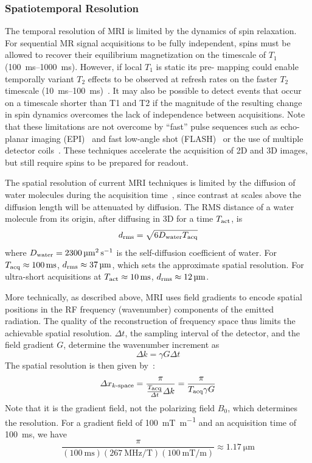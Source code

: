 \subsubsection{Spatiotemporal Resolution}

The temporal resolution of MRI is limited by the dynamics of spin relaxation. For sequential MR signal acquisitions to be fully independent, spins must be allowed to recover their equilibrium magnetization on the timescale of $T_1$ (\SIrange{100}{1000}{\milli\second}).
However, if local $T_1$ is static its pre- mapping could enable temporally variant $T_2$ effects to be observed at refresh rates on the faster $T_2$ timescale (\SIrange{10}{100}{\milli\second})~\cite{deichmann95}.
It may also be possible to detect events that occur on a timescale shorter than T1 and T2 if the magnitude of the resulting change in spin dynamics overcomes the lack of independence between acquisitions.
Note that these limitations are not overcome by ``fast'' pulse sequences such as echo-planar imaging (EPI)~\cite{stehling91} and fast low-angle shot (FLASH)~\cite{haase86} or the use of multiple detector coils~\cite{wiesinger06}.
These techniques accelerate the acquisition of 2D and 3D images, but still require spins to be prepared for readout.

The spatial resolution of current MRI techniques is limited by the diffusion of water molecules during the acquisition time~\cite{glover02}, since contrast at scales above the diffusion length will be attenuated by diffusion.
The RMS distance of a water molecule from its origin, after diffusing in 3D for a time $T_{\text{\scriptsize act}}$, is
\[d_{\text{\scriptsize rms}} = \sqrt{6D_{\text{\scriptsize water}}T_{\text{\scriptsize acq}}}\]
where $D_{\text{\scriptsize water}}=\SI{2300}{\micro\meter\squared\per\second}$ is the self-diffusion coefficient of water.
For $T_{\text{\scriptsize acq}}\approx\SI{100}{\milli\second}$, $d_{\text{\scriptsize rms}}\approx\SI{37}{\micro\meter}$, which sets the approximate spatial resolution.
For ultra-short acquisitions at $T_{\text{\scriptsize act}}\approx\SI{10}{\milli\second}$, $d_{\text{\scriptsize rms}}\approx\SI{12}{\micro\meter}$.

More technically, as described above, MRI uses field gradients to encode spatial positions in the RF frequency (wavenumber) components of the emitted radiation.
The quality of the reconstruction of frequency space thus limits the achievable spatial resolution.
$\Delta t$, the sampling interval of the detector, and the field gradient $G$, determine the wavenumber increment as
\[\Delta k = \gamma G \Delta t\]
The spatial resolution is then given by~\cite{glover02}:
\[\Delta x_{\text{\scriptsize $k$-space}} = \frac{\pi}{\frac{T_{\text{\scriptsize acq}}}{\Delta t} \Delta k} = \frac{\pi}{T_{\text{\scriptsize acq}} \gamma G}\]
Note that it is the gradient field, not the polarizing field $B_0$, which determines the resolution. For a gradient field of \SI{100}{\milli\tesla\per\meter} and an acquisition time of \SI{100}{\milli\second}, we have
\[\frac{\pi}{\left(\SI{100}{\milli\second}\right)\left(\SI{267}{\MHz\per\tesla}\right)\left(\SI{100}{\milli\tesla\per\meter}\right)}\approx \SI{1.17}{\micro\meter}\]

